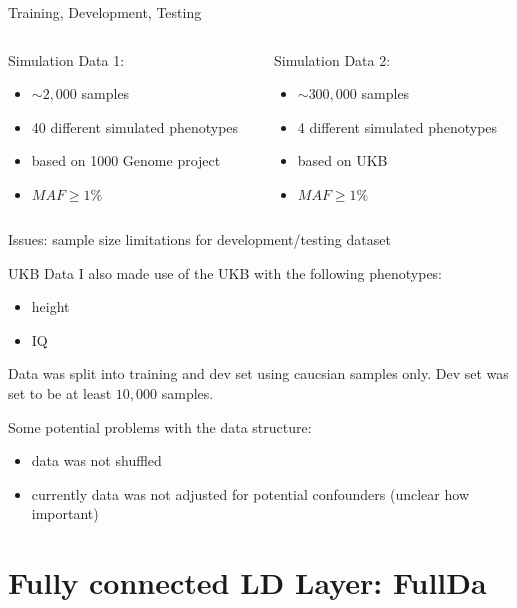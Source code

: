 \documentclass{beamer}
\begin{document}
\begin{frame}[t]{Training, Development, Testing}
  \begin{columns}[t]
    \begin{column}{0.5\textwidth}
      Simulation Data 1:\\
      \begin{itemize}
        \item $\sim2,000$ samples
        \item 40 different simulated phenotypes
        \item based on 1000 Genome project
        \item $MAF\geq1\%$
      \end{itemize}
    \end{column}
    \begin{column}{0.5\textwidth}
     Simulation Data 2: 
     \begin{itemize}
       \item $\sim300,000$ samples
       \item 4 different simulated phenotypes
       \item based on UKB
        \item $MAF\geq1\%$
     \end{itemize}
    \end{column}
  \end{columns}
  Issues: sample size limitations for development/testing dataset 
\end{frame}

\begin{frame}[t]{UKB Data}
  I also made use of the UKB with the following phenotypes:
  \begin{itemize}
    \item height
    \item IQ
  \end{itemize}
  Data was split into training and dev set using caucsian samples only.
  Dev set was set to be at least $10,000$ samples.

  Some potential problems with the data structure:
  \begin{itemize}
    \item data was not shuffled 
    \item currently data was not adjusted for potential confounders (unclear how important)
  \end{itemize}
\end{frame}

\section{Fully connected LD Layer: FullDa}
\end{document}
